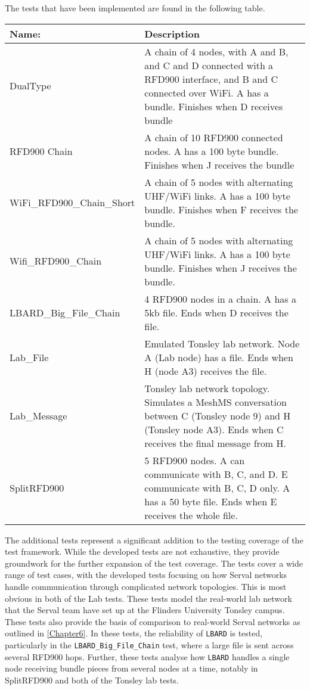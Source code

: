 The tests that have been implemented are found in the following table.
\begin{table}[h!]
    \centering
    \begin{tabularx}{\textwidth}{l|X}
        \textbf{Name:}  &  \textbf{Description} \\ \hline
        DualType            &   A chain of 4 nodes, with A and B, and C and D connected with a RFD900 interface, and B and C connected over WiFi. A has a bundle. Finishes when D receives bundle \\ \hline
        RFD900 Chain    &   A chain of 10 RFD900 connected nodes. A has a 100 byte bundle. Finishes when J receives the bundle   \\ \hline
        WiFi\_RFD900\_Chain\_Short & A chain of 5 nodes with alternating UHF/WiFi links. A has a 100 byte bundle. Finishes when F receives the bundle. \\ \hline
        Wifi\_RFD900\_Chain & A chain of 5 nodes with alternating UHF/WiFi links. A has a 100 byte bundle. Finishes when J receives the bundle.     \\ \hline
        LBARD\_Big\_File\_Chain & 4 RFD900 nodes in a chain. A has a 5kb file. Ends when D receives the file.  \\ \hline
        Lab\_File   & Emulated Tonsley lab network. Node A (Lab node) has a file. Ends when H (node A3) receives the file.  \\ \hline
        Lab\_Message& Tonsley lab network topology. Simulates a MeshMS conversation between C (Tonsley node 9) and H (Tonsley node A3). Ends when C receives the final message from H.   \\ \hline
        SplitRFD900 & 5 RFD900 nodes. A can communicate with B, C, and D. E communicate with B, C, D only. A has a 50 byte file. Ends when E receives the whole file. \\ \hline        
    \end{tabularx}
\end{table}

\pagebreak


The additional tests represent a significant addition to the testing coverage of the test framework.
While the developed tests are not exhaustive, they provide groundwork for the further expansion of the test coverage.
The tests cover a wide range of test cases, with the developed tests focusing on how Serval networks handle communication through complicated network topologies.
This is most obvious in both of the Lab tests. These tests model the real-world lab network that the Serval team have set up at the Flinders University Tonsley campus.
These tests also provide the basis of comparison to real-world Serval networks as outlined in \chaptername{ \ref{Chapter6}}.
In these tests, the reliability of \texttt{LBARD} is tested, particularly in the \texttt{LBARD\_Big\_File\_Chain} test, where a large file is sent across several RFD900 hops.
Further, these tests analyse how \texttt{LBARD} handles a single node receiving bundle pieces from several nodes at a time, notably in SplitRFD900 and both of the Tonsley lab tests.


